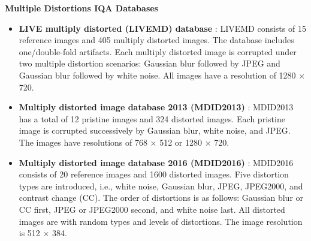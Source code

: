 \textbf{Multiple Distortions IQA Databases}
\begin{itemize}
    \item \textbf{LIVE multiply distorted (LIVEMD) database} \cite{LIVEMD}: LIVEMD consists of 15 reference images and 405 multiply distorted images. The database includes one/double-fold artifacts. Each multiply distorted image is corrupted under two multiple distortion scenarios: Gaussian blur followed by JPEG and Gaussian blur followed by white noise. All images have a resolution of 1280 $\times$ 720.
    \item \textbf{Multiply distorted image database 2013 (MDID2013)} \cite{MDID2013}: MDID2013 has a total of 12 pristine images and 324 distorted images. Each pristine image is corrupted successively by Gaussian blur, white noise, and JPEG. The images have resolutions of 768 $\times$ 512 or 1280 $\times$ 720.
    \item \textbf{Multiply distorted image database 2016 (MDID2016)} \cite{MDID2016}: MDID2016 consists of 20 reference images and 1600 distorted images. Five distortion types are introduced, i.e., white noise, Gaussian blur, JPEG, JPEG2000, and contrast change (CC). The order of distortions is as follows: Gaussian blur or CC first, JPEG or JPEG2000 second, and white noise last. All distorted images are with random types and levels of distortions. The image resolution is 512 $\times$ 384.
\end{itemize}

